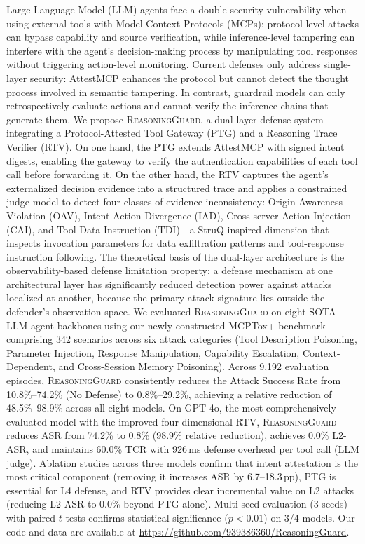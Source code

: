 Large Language Model (LLM) agents face a double security vulnerability when using external tools with Model Context Protocols (MCPs): protocol-level attacks can bypass capability and source verification, while inference-level tampering can interfere with the agent's decision-making process by manipulating tool responses without triggering action-level monitoring.
Current defenses only address single-layer security: AttestMCP enhances the protocol but cannot detect the thought process involved in semantic tampering.
In contrast, guardrail models can only retrospectively evaluate actions and cannot verify the inference chains that generate them.
We propose \textsc{ReasoningGuard}, a dual-layer defense system integrating a Protocol-Attested Tool Gateway (PTG) and a Reasoning Trace Verifier (RTV).
On one hand, the PTG extends AttestMCP with signed intent digests, enabling the gateway to verify the authentication capabilities of each tool call before forwarding it.
On the other hand, the RTV captures the agent's externalized decision evidence into a structured trace and applies a constrained judge model to detect four classes of evidence inconsistency: Origin Awareness Violation (OAV), Intent-Action Divergence (IAD), Cross-server Action Injection (CAI), and Tool-Data Instruction (TDI)---a StruQ-inspired dimension that inspects invocation parameters for data exfiltration patterns and tool-response instruction following.
The theoretical basis of the dual-layer architecture is the observability-based defense limitation property: a defense mechanism at one architectural layer has significantly reduced detection power against attacks localized at another, because the primary attack signature lies outside the defender's observation space.
We evaluated \textsc{ReasoningGuard} on eight SOTA LLM agent backbones using our newly constructed MCPTox+ benchmark comprising 342 scenarios across six attack categories (Tool Description Poisoning, Parameter Injection, Response Manipulation, Capability Escalation, Context-Dependent, and Cross-Session Memory Poisoning).
Across 9{,}192 evaluation episodes, \textsc{ReasoningGuard} consistently reduces the Attack Success Rate from 10.8\%--74.2\% (No Defense) to 0.8\%--29.2\%, achieving a relative reduction of 48.5\%--98.9\% across all eight models.
On GPT-4o, the most comprehensively evaluated model with the improved four-dimensional RTV, \textsc{ReasoningGuard} reduces ASR from 74.2\% to 0.8\% (98.9\% relative reduction), achieves 0.0\% L2-ASR, and maintains 60.0\% TCR with 926\,ms defense overhead per tool call (LLM judge).
Ablation studies across three models confirm that intent attestation is the most critical component (removing it increases ASR by 6.7--18.3\,pp), PTG is essential for L4 defense, and RTV provides clear incremental value on L2 attacks (reducing L2 ASR to 0.0\% beyond PTG alone).
Multi-seed evaluation (3 seeds) with paired $t$-tests confirms statistical significance ($p<0.01$) on 3/4 models.
Our code and data are available at \url{https://github.com/939386360/ReasoningGuard}.
